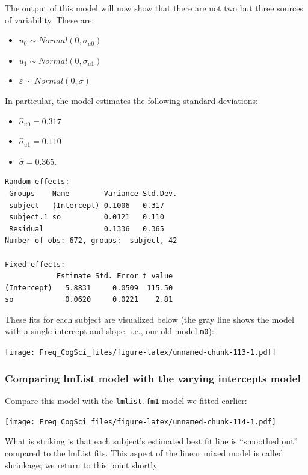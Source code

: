 \documentclass[12pt,]{krantz}
\providecommand{\tightlist}{%
  \setlength{\itemsep}{0pt}\setlength{\parskip}{0pt}}
\begin{document}
The output of this model will now show that there are not two but three sources of variability. These are:

\begin{itemize}
\tightlist
\item
  \(u_0 \sim Normal(0,\sigma_{u0})\)
\item
  \(u_1 \sim Normal(0,\sigma_{u1})\)
\item
  \(\varepsilon \sim Normal(0,\sigma)\)
\end{itemize}

In particular, the model estimates the following standard deviations:

\begin{itemize}
\tightlist
\item
  \(\hat\sigma_{u0}=0.317\)
\item
  \(\hat\sigma_{u1}=0.110\)
\item
  \(\hat\sigma = 0.365\).
\end{itemize}

\begin{verbatim}
Random effects:
 Groups    Name        Variance Std.Dev.
 subject   (Intercept) 0.1006   0.317   
 subject.1 so          0.0121   0.110   
 Residual              0.1336   0.365   
Number of obs: 672, groups:  subject, 42

Fixed effects:
            Estimate Std. Error t value
(Intercept)   5.8831     0.0509  115.50
so            0.0620     0.0221    2.81
\end{verbatim}

These fits for each subject are visualized below (the gray line shows the model with a single intercept and slope, i.e., our old model \texttt{m0}):

\texttt{[image: Freq\_CogSci\_files/figure-latex/unnamed-chunk-113-1.pdf]}

\hypertarget{comparing-lmlist-model-with-the-varying-intercepts-model}{%
\subsubsection{Comparing lmList model with the varying intercepts model}\label{comparing-lmlist-model-with-the-varying-intercepts-model}}

Compare this model with the \texttt{lmlist.fm1} model we fitted earlier:

\texttt{[image: Freq\_CogSci\_files/figure-latex/unnamed-chunk-114-1.pdf]}

What is striking is that each subject's estimated best fit line is ``smoothed out'' compared to the lmList fits. This aspect of the linear mixed model is called shrinkage; we return to this point shortly.
\end{document}
